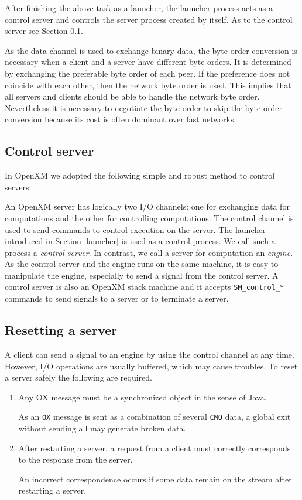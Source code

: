 After finishing the above task as a launcher, the launcher process
acts as a control server and controls the server process created by
itself. As to the control server see Section \ref{control}.

As the data channel is used to exchange binary data,
the byte order conversion is necessary when a
client and a server have different byte orders. It is determined by
exchanging the preferable byte order of each peer. If the preference
does not coincide with each other,
then the network byte order is used.
This implies that all servers and clients should be able to
handle the network byte
order. Nevertheless it is necessary to negotiate the byte order to
skip the byte order conversion because its cost is often dominant over
fast networks.


\subsection{Control server}
\label{control}
In OpenXM we adopted the following simple and robust method to 
control servers.

An OpenXM server has logically two I/O channels: one for exchanging
data for computations and the other for controlling computations. The
control channel is used to send commands to control execution on the
server. The launcher introduced in Section \ref{launcher}
is used as a control process. We call such a process a {\it
control server}. In contrast, we call a server for computation an {\it
engine}. As the control server and the engine runs on the
same machine, it is easy to manipulate the engine, especially to
send a signal from the control server. A control server is also an
OpenXM stack machine and it accepts {\tt SM\_control\_*} commands
to send signals to a server or to terminate a server.

\subsection{Resetting a server}

A client can send a signal to an engine by using the control channel 
at any time. However, I/O operations are usually buffered,
which may cause troubles.
To reset a server safely the following are required.

\begin{enumerate}
\item Any OX message must be a synchronized object in the sense of Java.

As an {\tt OX} message is sent as a combination of several {\tt CMO}
data, a global exit without sending all may generate broken data.

\item After restarting a server, a request from a client 
must correctly corresponds to the response from the server.

An incorrect correspondence occurs if some data remain on the stream
after restarting a server.
\end{enumerate}

